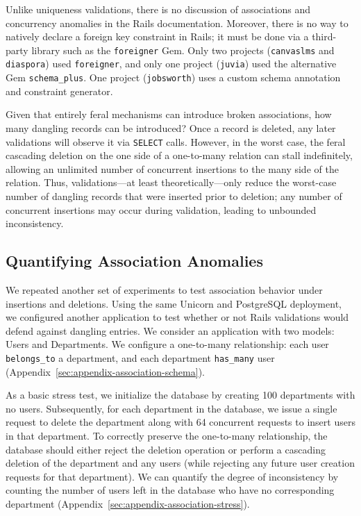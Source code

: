 Unlike uniqueness validations, there is no discussion of associations
and concurrency anomalies in the Rails documentation. Moreover, there
is no way to natively declare a foreign key constraint in Rails; it
must be done via a third-party library such as the \texttt{foreigner}
Gem. Only two projects (\texttt{canvaslms} and \texttt{diaspora}) used
\texttt{foreigner}, and only one project (\texttt{juvia}) used the
alternative Gem \texttt{schema\_plus}. One project
(\texttt{jobsworth}) uses a custom schema annotation and constraint
generator.

 Given that entirely
feral mechanisms can introduce broken associations, how many dangling
records can be introduced? Once a record is deleted, any later
validations will observe it via \texttt{SELECT} calls. However, in the
worst case, the feral cascading deletion on the one side of a
one-to-many relation can stall indefinitely, allowing an unlimited
number of concurrent insertions to the many side of the
relation. Thus, validations---at least theoretically---only reduce the
worst-case number of dangling records that were inserted prior to
deletion; any number of concurrent insertions may occur during
validation, leading to unbounded inconsistency.

\subsection{Quantifying Association Anomalies}

We repeated another set of experiments to test association behavior
under insertions and deletions. Using the same Unicorn and PostgreSQL
deployment, we configured another application to test whether or not
Rails validations would defend against dangling entries. We consider
an application with two models: Users and Departments. We configure a
one-to-many relationship: each user \texttt{belongs\_to} a department,
and each department \texttt{has\_many} user
(Appendix~\ref{sec:appendix-association-schema}).

As a basic stress test, we initialize the database by creating 100
departments with no users. Subsequently, for each department in the
database, we issue a single request to delete the department along
with 64 concurrent requests to insert users in that department. To
correctly preserve the one-to-many relationship, the database should
either reject the deletion operation or perform a cascading deletion
of the department and any users (while rejecting any future user
creation requests for that department). We can quantify the degree of
inconsistency by counting the number of users left in the database who
have no corresponding department (Appendix~\ref{sec:appendix-association-stress}).

